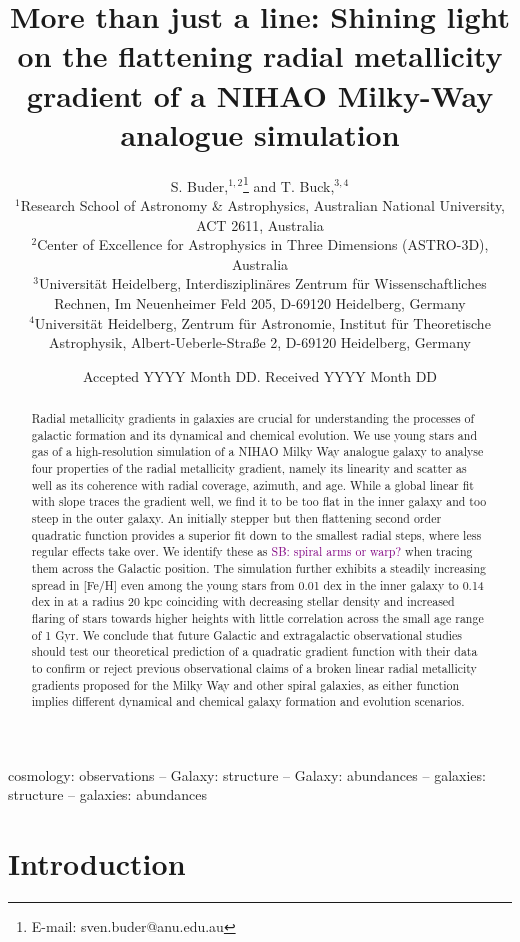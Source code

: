 \documentclass[fleqn,usenatbib]{mnras}
\title[Radial metallicity gradients in NIHAO]{More than just a line: Shining light on the flattening radial metallicity gradient of a NIHAO Milky-Way analogue simulation}
\author[S. Buder and T. Buck]{
S. Buder,$^{1,2}$\thanks{E-mail: sven.buder@anu.edu.au} and
T. Buck,$^{3,4}$
\\
$^{1}$Research School of Astronomy \& Astrophysics, Australian National University, ACT 2611, Australia\\
$^{2}$Center of Excellence for Astrophysics in Three Dimensions (ASTRO-3D), Australia\\
$^{3}$Universit{\"a}t Heidelberg, Interdisziplin{\"a}res Zentrum f{\"u}r Wissenschaftliches Rechnen, Im Neuenheimer Feld 205, D-69120 Heidelberg, Germany\\
$^{4}$Universit{\"a}t Heidelberg, Zentrum f{\"u}r Astronomie, Institut f{\"u}r Theoretische Astrophysik, Albert-Ueberle-Straße 2, D-69120 Heidelberg, Germany
}
\date{Accepted YYYY Month DD. Received YYYY Month DD}
\newcommand{\SB}[1]{{\textcolor{purple}{SB: #1}}}
\begin{document}
\label{firstpage}
\pagerange{\pageref{firstpage}--\pageref{lastpage}}
\maketitle

\begin{abstract} %
Radial metallicity gradients in galaxies are crucial for understanding the processes of galactic formation and its dynamical and chemical evolution.
We use young stars and gas of a high-resolution simulation of a NIHAO Milky Way analogue galaxy to analyse four properties of the radial metallicity gradient, namely its linearity and scatter as well as its coherence with radial coverage, azimuth, and age.
While a global linear fit with slope traces the gradient well, we find it to be too flat in the inner galaxy and too steep in the outer galaxy. An initially stepper but then flattening second order quadratic function provides a superior fit down to the smallest radial steps, where less regular effects take over. We identify these as \SB{spiral arms or warp?} when tracing them across the Galactic position. The simulation further exhibits a steadily increasing spread in [Fe/H] even among the young stars from 0.01 dex in the inner galaxy to 0.14 dex in at a radius 20 kpc coinciding with decreasing stellar density and increased flaring of stars towards higher heights with little correlation across the small age range of 1 Gyr.
We conclude that future Galactic and extragalactic observational studies should test our theoretical prediction of a quadratic gradient function with their data to confirm or reject previous observational claims of a broken linear radial metallicity gradients proposed for the Milky Way and other spiral galaxies, as either function implies different dynamical and chemical galaxy formation and evolution scenarios.
\end{abstract}
\begin{keywords}
cosmology: observations -- Galaxy: structure -- Galaxy: abundances  -- galaxies: structure -- galaxies: abundances
\end{keywords}



\section{Introduction}
\label{sec:intro}
\end{document}

